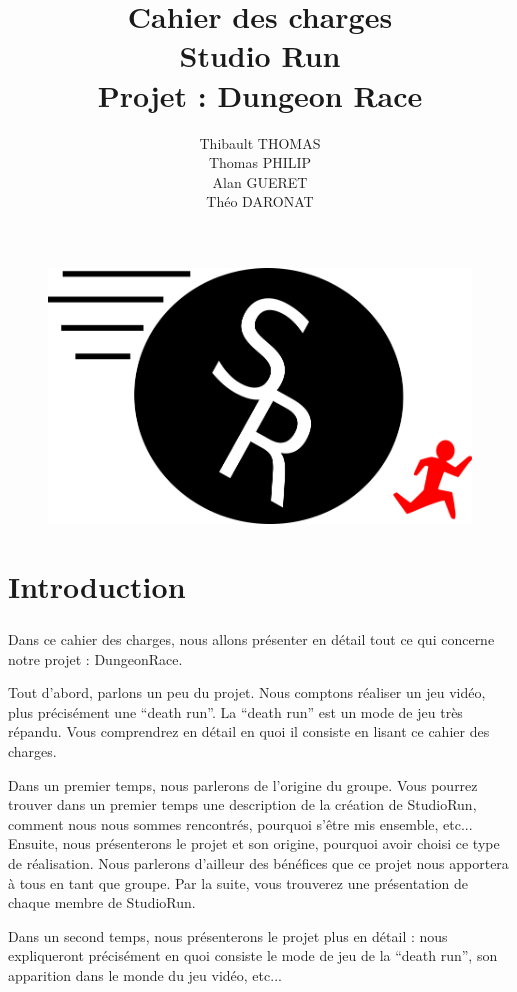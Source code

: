 \documentclass[12pt]{report}
\title{\huge Cahier des charges \\ \LARGE Studio Run\\ \large Projet : Dungeon Race}
\date{}
\author{\small Thibault THOMAS \\ \small Thomas PHILIP \\ \small Alan GUERET \\ \small Théo DARONAT}
\begin{document}
\begin{figure}
\centering\includegraphics[scale=0.3]{logo2_final.png} 
\maketitle
\end{figure}
\tableofcontents
\pagestyle{IHA-fancy-style}
\pagebreak
\chapter{Introduction}
\paragraph{}
	Dans ce cahier des charges, nous allons présenter en détail tout ce qui concerne notre projet : DungeonRace.

	Tout d’abord, parlons un peu du projet. Nous comptons réaliser un jeu vidéo, plus précisément une “death run”. La “death run” est un mode de jeu très répandu. Vous comprendrez en détail en quoi il consiste en lisant ce cahier des charges. 

	Dans un premier temps, nous parlerons de l’origine du groupe. Vous pourrez trouver dans un premier temps une description de la création de StudioRun, comment nous nous sommes rencontrés, pourquoi s’être mis ensemble, etc... Ensuite, nous présenterons le projet et son origine, pourquoi avoir choisi ce type de réalisation. Nous parlerons d’ailleur des bénéfices que ce projet nous apportera à tous en tant que groupe. Par la suite, vous trouverez une présentation de chaque membre de StudioRun. 
	
	Dans un second temps, nous présenterons le projet plus en détail : nous expliqueront précisément en quoi consiste le mode de jeu de la “death run”, son apparition dans le monde du jeu vidéo, etc...
	
\end{document}
